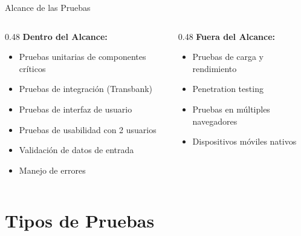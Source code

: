 \documentclass[aspectratio=169]{beamer}
\begin{document}
\begin{frame}{Alcance de las Pruebas}
\begin{columns}[T]
\begin{column}{0.48\textwidth}
\textbf{\textcolor{successgreen}{Dentro del Alcance:}}
\begin{itemize}
    \item[\textcolor{successgreen}{\faCheckCircle}] Pruebas unitarias de componentes críticos
    \item[\textcolor{successgreen}{\faCheckCircle}] Pruebas de integración (Transbank)
    \item[\textcolor{successgreen}{\faCheckCircle}] Pruebas de interfaz de usuario
    \item[\textcolor{successgreen}{\faCheckCircle}] Pruebas de usabilidad con 2 usuarios
    \item[\textcolor{successgreen}{\faCheckCircle}] Validación de datos de entrada
    \item[\textcolor{successgreen}{\faCheckCircle}] Manejo de errores
\end{itemize}
\end{column}

\begin{column}{0.48\textwidth}
\textbf{\textcolor{warningorange}{Fuera del Alcance:}}
\begin{itemize}
    \item[\textcolor{warningorange}{\faTimesCircle}] Pruebas de carga y rendimiento
    \item[\textcolor{warningorange}{\faTimesCircle}] Penetration testing
    \item[\textcolor{warningorange}{\faTimesCircle}] Pruebas en múltiples navegadores
    \item[\textcolor{warningorange}{\faTimesCircle}] Dispositivos móviles nativos
\end{itemize}
\end{column}
\end{columns}
\end{frame}

\section{Tipos de Pruebas}
\end{document}
